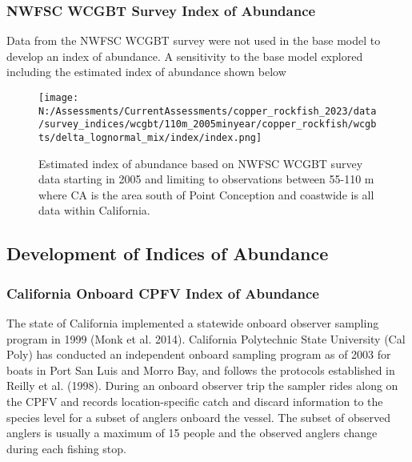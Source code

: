 \documentclass[11pt,
  english,
  letterpaper,
]{article}
\begin{document}
\pagebreak

\hypertarget{nwfsc-wcgbt-survey-index-of-abundance}{%
\subsubsection{NWFSC WCGBT Survey Index of Abundance}\label{nwfsc-wcgbt-survey-index-of-abundance}}

Data from the NWFSC WCGBT survey were not used in the base model to develop an index of abundance. A sensitivity to the base model explored including the estimated index of abundance shown below

\begin{figure}
\centering
\texttt{[image: N:/Assessments/CurrentAssessments/copper\_rockfish\_2023/data/survey\_indices/wcgbt/110m\_2005minyear/copper\_rockfish/wcgbts/delta\_lognormal\_mix/index/index.png]}
\caption{Estimated index of abundance based on NWFSC WCGBT survey data starting in 2005 and limiting to observations between 55-110 m where CA is the area south of Point Conception and coastwide is all data within California.\label{fig:wcgbt-index}}
\end{figure}

\pagebreak

\hypertarget{development-of-indices-of-abundance}{%
\subsection{Development of Indices of Abundance}\label{development-of-indices-of-abundance}}

\hypertarget{onboard-cpfv-index}{%
\subsubsection{California Onboard CPFV Index of Abundance}\label{onboard-cpfv-index}}

The state of California implemented a statewide onboard observer sampling program in 1999 (Monk et al. 2014). California Polytechnic State University (Cal Poly) has conducted an independent onboard sampling program as of 2003 for boats in Port San Luis and Morro Bay, and follows the protocols established in Reilly et al. (1998). During an onboard observer trip the sampler rides along on the CPFV and records location-specific catch and discard information to the species level for a subset of anglers onboard the vessel. The subset of observed anglers is usually a maximum of 15 people and the observed anglers change during each fishing stop.
\end{document}
